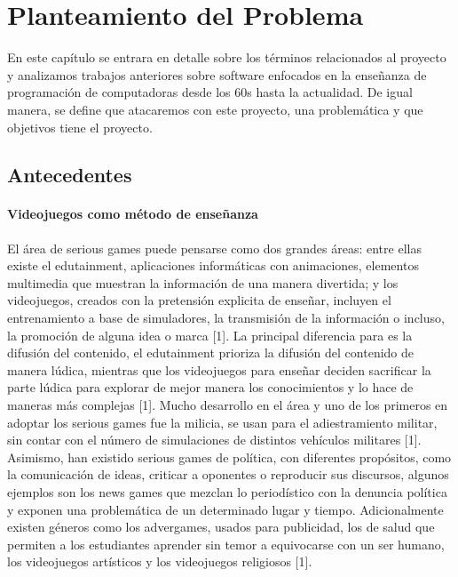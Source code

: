\chapter{Planteamiento del Problema}
En este capítulo se entrara en detalle sobre los términos relacionados al proyecto y analizamos 
trabajos anteriores sobre software enfocados en la enseñanza de programación de computadoras desde los 
60s hasta la actualidad. De igual manera, se define que atacaremos con este proyecto, una problemática y que objetivos tiene el proyecto.

\section{Antecedentes}

\subsubsection{Videojuegos como método de enseñanza}
El área de serious games puede pensarse como dos grandes áreas: entre ellas existe el edutainment, 
aplicaciones informáticas con animaciones, elementos multimedia que muestran la información de una manera divertida; 
y los videojuegos, creados con la pretensión explicita de enseñar, incluyen el entrenamiento a base de simuladores, 
la transmisión de la información o incluso, la promoción de alguna idea o marca [1]. 
La principal diferencia para es la difusión del contenido, el edutainment prioriza 
la difusión del contenido de manera lúdica, mientras que los videojuegos para enseñar deciden 
sacrificar la parte lúdica para explorar de mejor manera los conocimientos y lo hace de maneras más complejas [1].
Mucho desarrollo en el área y uno de los primeros en adoptar los serious games fue la milicia, 
se usan para el adiestramiento militar, sin contar con el número de simulaciones de distintos vehículos militares [1]. 
Asimismo, han existido serious games de política, con diferentes propósitos, como la comunicación de ideas, 
criticar a oponentes o reproducir sus discursos, 
algunos ejemplos son los news games que mezclan lo periodístico con la denuncia política y exponen una problemática de un determinado lugar y tiempo. 
Adicionalmente existen géneros como los advergames, usados para publicidad, 
los de salud que permiten a los estudiantes aprender sin temor a equivocarse con un ser humano, 
los videojuegos artísticos y los videojuegos religiosos [1].

